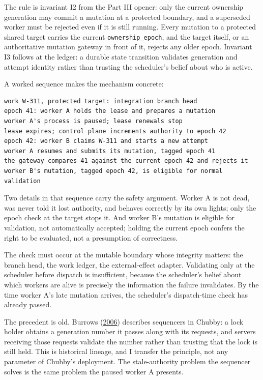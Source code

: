 The rule is invariant I2 from the Part III opener: only the current ownership generation may commit a mutation at a protected boundary, and a superseded worker must be rejected even if it is still running. Every mutation to a protected shared target carries the current \texttt{ownership\_epoch}, and the target itself, or an authoritative mutation gateway in front of it, rejects any older epoch. Invariant I3 follows at the ledger: a durable state transition validates generation and attempt identity rather than trusting the scheduler's belief about who is active.

A worked sequence makes the mechanism concrete:

\begin{verbatim}
work W-311, protected target: integration branch head
epoch 41: worker A holds the lease and prepares a mutation
worker A's process is paused; lease renewals stop
lease expires; control plane increments authority to epoch 42
epoch 42: worker B claims W-311 and starts a new attempt
worker A resumes and submits its mutation, tagged epoch 41
the gateway compares 41 against the current epoch 42 and rejects it
worker B's mutation, tagged epoch 42, is eligible for normal validation
\end{verbatim}

Two details in that sequence carry the safety argument. Worker A is not dead, was never told it lost authority, and behaves correctly by its own lights; only the epoch check at the target stops it. And worker B's mutation is eligible for validation, not automatically accepted; holding the current epoch confers the right to be evaluated, not a presumption of correctness.

The check must occur at the mutable boundary whose integrity matters: the branch head, the work ledger, the external-effect adapter. Validating only at the scheduler before dispatch is insufficient, because the scheduler's belief about which workers are alive is precisely the information the failure invalidates. By the time worker A's late mutation arrives, the scheduler's dispatch-time check has already passed.

The precedent is old. Burrows (\href{https://www.usenix.org/conference/osdi-06/chubby-lock-service-loosely-coupled-distributed-systems}{2006}) describes sequencers in Chubby: a lock holder obtains a generation number it passes along with its requests, and servers receiving those requests validate the number rather than trusting that the lock is still held. This is historical lineage, and I transfer the principle, not any parameter of Chubby's deployment. The stale-authority problem the sequencer solves is the same problem the paused worker A presents.

